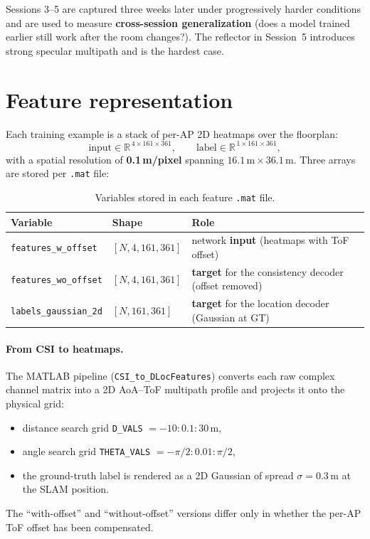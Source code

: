 \documentclass[11pt,a4paper]{article}
\begin{document}
Sessions 3--5 are captured three weeks later under progressively harder conditions and are used
to measure \textbf{cross-session generalization} (does a model trained earlier still work after
the room changes?). The reflector in Session~5 introduces strong specular multipath and is the
hardest case.

\section{Feature representation}

Each training example is a stack of per-AP 2D heatmaps over the floorplan:
\[
\text{input} \in \mathbb{R}^{\,4 \times 161 \times 361}, \qquad
\text{label} \in \mathbb{R}^{\,1 \times 161 \times 361},
\]
with a spatial resolution of \textbf{0.1\,m/pixel} spanning $16.1\,\text{m}\times36.1\,\text{m}$.
Three arrays are stored per \texttt{.mat} file:

\begin{table}[h]
\centering
\caption{Variables stored in each feature \texttt{.mat} file.}
\begin{tabular}{@{}lll@{}}
\toprule
Variable & Shape & Role \\
\midrule
\texttt{features\_w\_offset}  & $[N,4,161,361]$ & network \textbf{input} (heatmaps with ToF offset) \\
\texttt{features\_wo\_offset} & $[N,4,161,361]$ & \textbf{target} for the consistency decoder (offset removed) \\
\texttt{labels\_gaussian\_2d} & $[N,161,361]$   & \textbf{target} for the location decoder (Gaussian at GT) \\
\bottomrule
\end{tabular}
\end{table}

\paragraph{From CSI to heatmaps.} The MATLAB pipeline (\texttt{CSI\_to\_DLocFeatures}) converts
each raw complex channel matrix into a 2D AoA--ToF multipath profile and projects it onto the
physical grid:
\begin{itemize}[nosep]
  \item distance search grid \texttt{D\_VALS} $= -10\!:\!0.1\!:\!30$\,m,
  \item angle search grid \texttt{THETA\_VALS} $= -\pi/2\!:\!0.01\!:\!\pi/2$,
  \item the ground-truth label is rendered as a 2D Gaussian of spread $\sigma = 0.3$\,m at the
  SLAM position.
\end{itemize}
The ``with-offset'' and ``without-offset'' versions differ only in whether the per-AP ToF offset
has been compensated.
\end{document}
